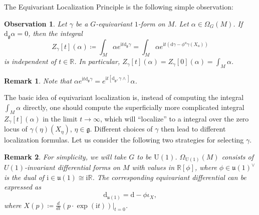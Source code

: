 \documentclass[12pt]{amsart}
\numberwithin{table}{section}
\numberwithin{equation}{section}
\newtheorem{rmk}{Remark}[section]
\newtheorem{obs}{Observation}[section]
\theoremstyle{plain}
\newcommand{\R}{\mathbb{R}}
\newcommand{\U}{\mathrm{U}}
\newcommand{\ut}{\mathfrak{u}}
\newcommand{\dg}{\mathrm{d}_{\mathfrak{g}}}
\newcommand{\du}{\mathrm{d}_{\mathfrak{u}(1)}}
\begin{document}
The Equivariant Localization Principle is the following simple observation:
\begin{obs}\label{oelp}
	Let $\gamma$ be a $G$-equivariant $1$-form on $M$.  Let $\alpha \in \Omega_G(M)$. If $\dg\alpha = 0$, then the integral
	\begin{equation}\label{elp}
		Z_{\gamma}[t](\alpha)\coloneqq\int_M \alpha e^{\mathrm{i}t \dg\gamma} = \int_M \alpha e^{\mathrm{i}t\left(\mathrm{d} \gamma -\phi^a \gamma(X_a)\right)}
	\end{equation}
	is independent of $t \in \R$. In particular, $Z_{\gamma}[t](\alpha) = Z_{\gamma}[0](\alpha) = \int_M \alpha$.
\end{obs}
\begin{rmk}
	Note that $\alpha e^{\mathrm{i}t \dg\gamma} = e^{\mathrm{i}t[\dg, \gamma \wedge]} \alpha$.
\end{rmk}
The basic idea of equivariant localization is, instead of computing the integral $\int_M \alpha$ directly, one should compute the superficially more complicated integral $Z_{\gamma}[t](\alpha)$ in the limit $t \to \infty$, which will ``localize'' to a integral over the zero locus of $\gamma(\eta)(X_{\eta})$, $\eta \in \mathfrak{g}$. 
Different choices of $\gamma$ then lead to different localization formulas. Let us consider the following two strategies for selecting $\gamma$. 
\begin{rmk}
	For simplicity, we will take $G$ to be $\mathrm{U}(1)$. $\Omega_{\U(1)}(M)$ consists of $U(1)$-invariant differential forms on $M$ with values in $\R[\phi]$, where $\phi \in \ut(1)^{\vee}$ is the dual of $\mathrm{i} \in \ut(1) \cong \mathrm{i} \R$. The corresponding equivariant differential can be expressed as
	\[
	\du = \mathrm{d} - \phi \iota_X,
	\]
	where $X(p)\coloneqq\frac{d}{dt} (p \cdot \exp(\mathrm{i}t))|_{t=0}$. 
\end{rmk}
\end{document}
